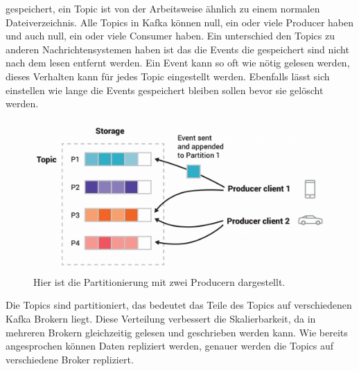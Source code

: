 gespeichert, ein Topic ist von der Arbeitsweise ähnlich zu einem normalen Dateiverzeichnis. Alle Topics in Kafka können null, ein oder viele Producer haben und auch null, ein oder viele Consumer haben. Ein unterschied den Topics zu anderen Nachrichtensystemen haben ist das die Events die gespeichert sind nicht nach dem lesen entfernt werden. Ein Event kann so oft wie nötig gelesen werden, dieses Verhalten kann für jedes Topic eingestellt werden. Ebenfalls lässt sich einstellen wie lange die Events gespeichert bleiben sollen bevor sie gelöscht werden.

\begin{figure}[H]
	\centering
	\includegraphics[width=1\linewidth]{resources/images/partition}
	\caption{Hier ist die Partitionierung mit zwei Producern dargestellt.}
	\label{fig:Partition}
\end{figure}

Die Topics sind partitioniert, das bedeutet das Teile des Topics auf verschiedenen Kafka Brokern liegt. Diese Verteilung verbessert die Skalierbarkeit, da in mehreren Brokern gleichzeitig gelesen und geschrieben werden kann. Wie bereits angesprochen können Daten repliziert werden, genauer werden die Topics auf verschiedene Broker repliziert.